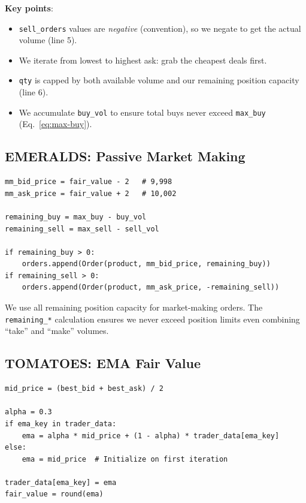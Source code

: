 \documentclass[11pt, letterpaper]{article}
\begin{document}
\textbf{Key points}:
\begin{itemize}
    \item \texttt{sell\_orders} values are \emph{negative} (convention), so we negate to get the actual volume (line 5).
    \item We iterate from lowest to highest ask: grab the cheapest deals first.
    \item \texttt{qty} is capped by both available volume and our remaining position capacity (line 6).
    \item We accumulate \texttt{buy\_vol} to ensure total buys never exceed \texttt{max\_buy} (Eq.~\ref{eq:max-buy}).
\end{itemize}

\subsection{EMERALDS: Passive Market Making}

\begin{lstlisting}[caption={Phase 2: Post resting orders inside the bot spread.}]
mm_bid_price = fair_value - 2   # 9,998
mm_ask_price = fair_value + 2   # 10,002

remaining_buy = max_buy - buy_vol
remaining_sell = max_sell - sell_vol

if remaining_buy > 0:
    orders.append(Order(product, mm_bid_price, remaining_buy))
if remaining_sell > 0:
    orders.append(Order(product, mm_ask_price, -remaining_sell))
\end{lstlisting}

We use all remaining position capacity for market-making orders. The \texttt{remaining\_*} calculation ensures we never exceed position limits even combining ``take'' and ``make'' volumes.

\subsection{TOMATOES: EMA Fair Value}

\begin{lstlisting}[caption={Dynamic fair value estimation using EMA.}]
mid_price = (best_bid + best_ask) / 2

alpha = 0.3
if ema_key in trader_data:
    ema = alpha * mid_price + (1 - alpha) * trader_data[ema_key]
else:
    ema = mid_price  # Initialize on first iteration

trader_data[ema_key] = ema
fair_value = round(ema)
\end{lstlisting}
\end{document}
